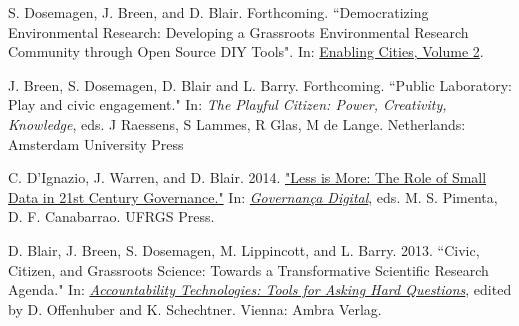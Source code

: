 \documentclass[10pt]{article}
\renewcommand{\section}[1]{\pagebreak[3]%
    \vspace{1.3\baselineskip}%
    \phantomsection\addcontentsline{toc}{section}{#1}%
    \noindent\llap{\scshape\smash{\parbox[t]{\marginparwidth}{\hyphenpenalty=10000\raggedright #1}}}%
    \vspace{-\baselineskip}\par}
\begin{document}
\begin{bibenum}

    \item S. Dosemagen, J. Breen, and D. Blair. Forthcoming. ``Democratizing Environmental Research: Developing a Grassroots Environmental Research Community through Open Source DIY Tools". In: \href{http://enablingcity.com/v2/}{Enabling Cities, Volume 2}.

    \item J. Breen, S. Dosemagen, D. Blair and L. Barry. Forthcoming. ``Public Laboratory: Play and civic engagement." In: \emph{The Playful Citizen: Power, Creativity, Knowledge}, eds. J Raessens, S
Lammes, R Glas, M de Lange. Netherlands: Amsterdam University Press

    \item C. D'Ignazio, J. Warren, and D. Blair. 2014. \href{http://publiclab.org/notes/donblair/12-02-2014/less-is-more-the-role-of-small-data-for-governance-in-the-21st-century}{"Less is More: The Role of Small Data in 21st Century Governance."}  In: \emph{\href{http://www.ufrgs.br/cegov/files/livros/gtdigital.pdf}{Governan\c{c}a Digital}}, eds. M. S. Pimenta, D. F. Canabarrao. UFRGS Press. 

    \item D. Blair, J. Breen, S. Dosemagen, M. Lippincott, and L. Barry. 2013. ``Civic, Citizen, and Grassroots Science: Towards a Transformative Scientific Research Agenda." In: \href{http://offenhuber.net/new-book-accountability-technologies-tools-for-asking-hard-questions/}{\emph{Accountability Technologies: Tools for Asking Hard Questions}}, edited by D. Offenhuber and K. Schechtner. Vienna: Ambra Verlag.

\end{bibenum}






\end{document}
